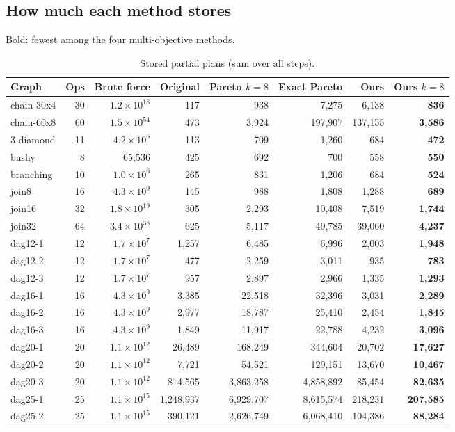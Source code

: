 \documentclass[10pt,a4paper]{article}
\begin{document}
\subsection{How much each method stores}
Bold: fewest among the four multi-objective methods.

\begin{longtable}{@{}lrr|rrrrr@{}}
\caption{Stored partial plans (sum over all steps).}\label{tab:stored}\\
\toprule
Graph & Ops & Brute force & Original & Pareto $k{=}8$ & Exact Pareto & \textbf{Ours} & Ours $k{=}8$\\
\midrule\endhead
chain-30x4 & 30 & $1.2\times10^{18}$ & 117 & 938 & 7{,}275 & 6{,}138 & \textbf{836}\\
chain-60x8 & 60 & $1.5\times10^{54}$ & 473 & 3{,}924 & 197{,}907 & 137{,}155 & \textbf{3{,}586}\\
3-diamond & 11 & $4.2\times10^{6}$ & 113 & 709 & 1{,}260 & 684 & \textbf{472}\\
bushy & 8 & 65{,}536 & 425 & 692 & 700 & 558 & \textbf{550}\\
branching & 10 & $1.0\times10^{6}$ & 265 & 831 & 1{,}206 & 684 & \textbf{524}\\
join8 & 16 & $4.3\times10^{9}$ & 145 & 988 & 1{,}808 & 1{,}288 & \textbf{689}\\
join16 & 32 & $1.8\times10^{19}$ & 305 & 2{,}293 & 10{,}408 & 7{,}519 & \textbf{1{,}744}\\
join32 & 64 & $3.4\times10^{38}$ & 625 & 5{,}117 & 49{,}785 & 39{,}060 & \textbf{4{,}237}\\
dag12-1 & 12 & $1.7\times10^{7}$ & 1{,}257 & 6{,}485 & 6{,}996 & 2{,}003 & \textbf{1{,}948}\\
dag12-2 & 12 & $1.7\times10^{7}$ & 477 & 2{,}259 & 3{,}011 & 935 & \textbf{783}\\
dag12-3 & 12 & $1.7\times10^{7}$ & 957 & 2{,}897 & 2{,}966 & 1{,}335 & \textbf{1{,}293}\\
dag16-1 & 16 & $4.3\times10^{9}$ & 3{,}385 & 22{,}518 & 32{,}396 & 3{,}031 & \textbf{2{,}289}\\
dag16-2 & 16 & $4.3\times10^{9}$ & 2{,}977 & 18{,}787 & 25{,}410 & 2{,}454 & \textbf{1{,}845}\\
dag16-3 & 16 & $4.3\times10^{9}$ & 1{,}849 & 11{,}917 & 22{,}788 & 4{,}232 & \textbf{3{,}096}\\
dag20-1 & 20 & $1.1\times10^{12}$ & 26{,}489 & 168{,}249 & 344{,}604 & 20{,}702 & \textbf{17{,}627}\\
dag20-2 & 20 & $1.1\times10^{12}$ & 7{,}721 & 54{,}521 & 129{,}151 & 13{,}670 & \textbf{10{,}467}\\
dag20-3 & 20 & $1.1\times10^{12}$ & 814{,}565 & 3{,}863{,}258 & 4{,}858{,}892 & 85{,}454 & \textbf{82{,}635}\\
dag25-1 & 25 & $1.1\times10^{15}$ & 1{,}248{,}937 & 6{,}929{,}707 & 8{,}615{,}574 & 218{,}231 & \textbf{207{,}585}\\
dag25-2 & 25 & $1.1\times10^{15}$ & 390{,}121 & 2{,}626{,}749 & 6{,}068{,}410 & 104{,}386 & \textbf{88{,}284}\\
\bottomrule
\end{longtable}
\end{document}
